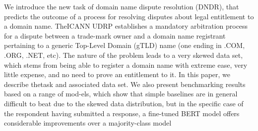 We introduce  the  new  task  of  domain  name dispute  resolution  (DNDR),  that  predicts  the outcome  of  a  process  for  resolving  disputes about legal entitlement to a domain name. TheICANN  UDRP  establishes  a  mandatory  arbitration process for a dispute between a trade-mark owner and a domain name registrant pertaining to a generic Top-Level Domain (gTLD) name (one ending in .COM, .ORG, .NET, etc). The  nature  of  the  problem  leads  to  a  very skewed data set, which stems from being able to register a domain name with extreme ease, very little expense, and no need to prove an entitlement to it.  In this paper, we describe thetask and associated data set.  We also present benchmarking results based on a range of mod-els,  which  show  that  simple  baselines  are  in general  difficult  to  beat  due  to  the  skewed data  distribution,  but  in  the  specific  case  of the  respondent  having  submitted  a  response, a fine-tuned BERT model offers considerable improvements over a majority-class model
